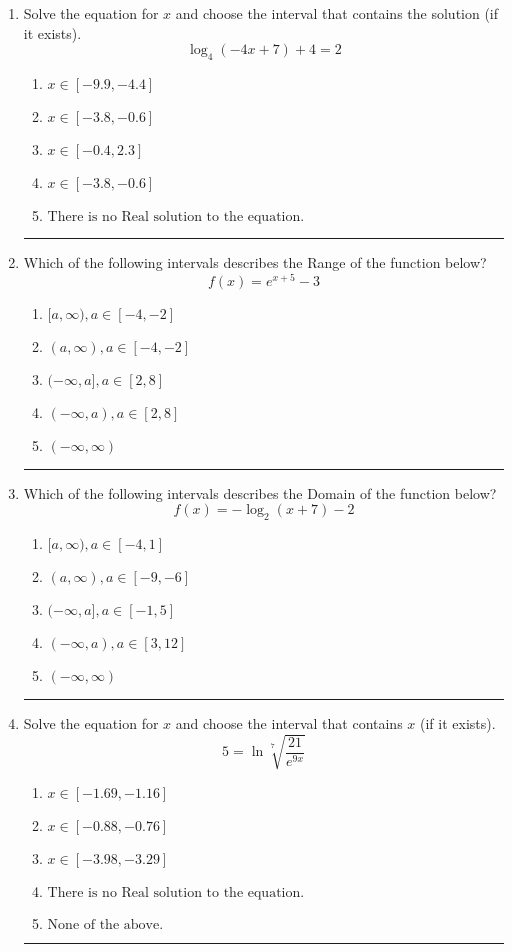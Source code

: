 \documentclass[14pt]{extbook}
\newcommand{\litem}[1]{\item#1\hspace*{-1cm}\rule{\textwidth}{0.4pt}}
\begin{document}
\begin{enumerate}
\litem{
Solve the equation for $x$ and choose the interval that contains the solution (if it exists).\[ \log_{4}{(-4x+7)}+4 = 2 \]\begin{enumerate}[label=\Alph*.]
\item \( x \in [-9.9, -4.4] \)
\item \( x \in [-3.8, -0.6] \)
\item \( x \in [-0.4, 2.3] \)
\item \( x \in [-3.8, -0.6] \)
\item \( \text{There is no Real solution to the equation.} \)

\end{enumerate} }
\litem{
Which of the following intervals describes the Range of the function below?\[ f(x) = e^{x+5}-3 \]\begin{enumerate}[label=\Alph*.]
\item \( [a, \infty), a \in [-4, -2] \)
\item \( (a, \infty), a \in [-4, -2] \)
\item \( (-\infty, a], a \in [2, 8] \)
\item \( (-\infty, a), a \in [2, 8] \)
\item \( (-\infty, \infty) \)

\end{enumerate} }
\litem{
Which of the following intervals describes the Domain of the function below?\[ f(x) = -\log_2{(x+7)}-2 \]\begin{enumerate}[label=\Alph*.]
\item \( [a, \infty), a \in [-4, 1] \)
\item \( (a, \infty), a \in [-9, -6] \)
\item \( (-\infty, a], a \in [-1, 5] \)
\item \( (-\infty, a), a \in [3, 12] \)
\item \( (-\infty, \infty) \)

\end{enumerate} }
\litem{
 Solve the equation for $x$ and choose the interval that contains $x$ (if it exists).\[  5 = \ln{\sqrt[7]{\frac{21}{e^{9x}}}} \]\begin{enumerate}[label=\Alph*.]
\item \( x \in [-1.69, -1.16] \)
\item \( x \in [-0.88, -0.76] \)
\item \( x \in [-3.98, -3.29] \)
\item \( \text{There is no Real solution to the equation.} \)
\item \( \text{None of the above.} \)


\end{enumerate}}
\end{enumerate}
\end{document}
